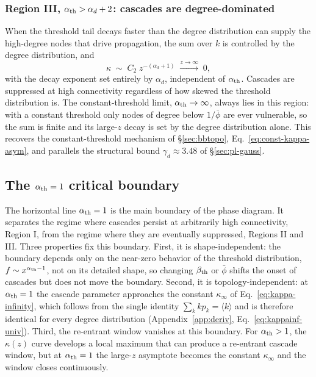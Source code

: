 \documentclass[]{revtex4-2}
\begin{document}
\subsubsection*{Region III, $\alpha_{\rm th}>\alpha_d+2$: cascades are degree-dominated}

When the threshold tail decays faster than the degree distribution can supply the high-degree nodes that drive propagation, the sum over $k$ is controlled by the degree distribution, and
\begin{equation}
    \kappa \;\sim\; C_2\;z^{-(\alpha_d+1)} \;\xrightarrow{z\to\infty}\; 0 ,
\end{equation}
with the decay exponent set entirely by $\alpha_d$, independent of $\alpha_{\rm th}$. Cascades are suppressed at high connectivity regardless of how skewed the threshold distribution is. The constant-threshold limit, $\alpha_{\rm th}\to\infty$, always lies in this region: with a constant threshold only nodes of degree below $1/\bar\phi$ are ever vulnerable, so the sum is finite and its large-$z$ decay is set by the degree distribution alone. This recovers the constant-threshold mechanism of \S\ref{sec:bbtopo}, Eq.~\eqref{eq:const-kappa-asym}, and parallels the structural bound $\gamma_d\approx3.48$ of \S\ref{sec:pl-gauss}.

\subsection{The $\alpha_{\rm th}=1$ critical boundary}

The horizontal line $\alpha_{\rm th}=1$ is the main boundary of the phase diagram. It separates the regime where cascades persist at arbitrarily high connectivity, Region I, from the regime where they are eventually suppressed, Regions II and III. Three properties fix this boundary. First, it is shape-independent: the boundary depends only on the near-zero behavior of the threshold distribution, $f\sim x^{\alpha_{\rm th}-1}$, not on its detailed shape, so changing $\beta_{\rm th}$ or $\bar\phi$ shifts the onset of cascades but does not move the boundary. Second, it is topology-independent: at $\alpha_{\rm th}=1$ the cascade parameter approaches the constant $\kappa_\infty$ of Eq.~\eqref{eq:kappa-infinity}, which follows from the single identity $\sum_k k p_k=\langle k\rangle$ and is therefore identical for every degree distribution (Appendix~\ref{app:deriv}, Eq.~\eqref{eq:kappainf-univ}). Third, the re-entrant window vanishes at this boundary. For $\alpha_{\rm th}>1$, the $\kappa(z)$ curve develops a local maximum that can produce a re-entrant cascade window, but at $\alpha_{\rm th}=1$ the large-$z$ asymptote becomes the constant $\kappa_\infty$ and the window closes continuously.
\end{document}
